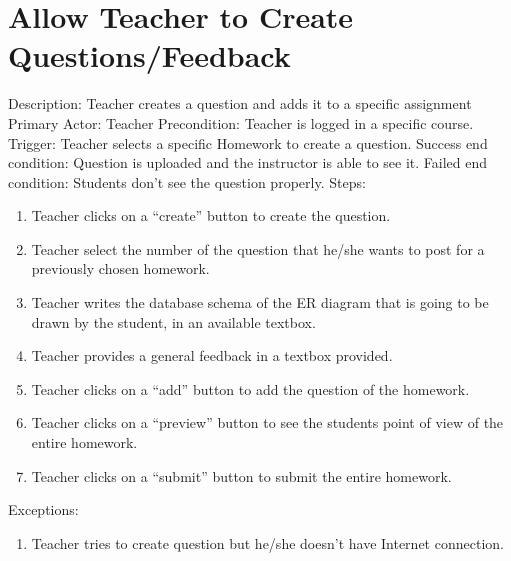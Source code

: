     \section{Allow Teacher to Create    Questions/Feedback}
        Description: Teacher creates a question and adds it to a specific assignment \newline
        Primary Actor: Teacher \newline
        Precondition: Teacher is logged in a specific course. \newline
        Trigger: Teacher selects a specific Homework to create a     question. \newline
        Success end condition: Question is uploaded and the instructor is able to see it. \newline
        Failed end condition: Students don’t see the question       properly. \newline
        \newline
        Steps:
        \begin{enumerate}
            \item{Teacher clicks on a “create” button to create the           question.}
            \item{Teacher select the number of the question that             he/she wants to post for a previously chosen               homework.}
            \item{Teacher writes the database schema of the ER              diagram that is going to be drawn by the student, in         an available textbox.}
            \item{Teacher provides a general feedback in a textbox            provided.}
            \item{Teacher clicks on a “add” button to add the                 question of the homework.}
            \item{Teacher clicks on a “preview” button to see the           students point of view of the entire homework.}
            \item{Teacher clicks on a “submit” button to submit the           entire homework.}
        \end{enumerate}
        Exceptions:
        \begin{enumerate}
            \item{Teacher tries to create question but he/she doesn't have Internet connection.}
        \end{enumerate}

    
